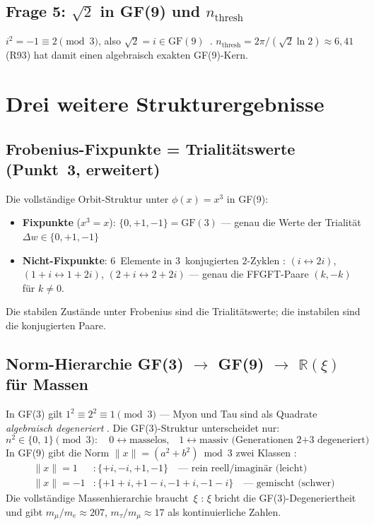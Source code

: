 \subsection{Frage 5: $\sqrt{2}$ in GF(9) und $n_\text{thresh}$}

$i^2 = -1\equiv 2\pmod{3}$, also $\sqrt{2}=i\in\mathrm{GF}(9)$~\BM.
$n_\text{thresh} = 2\pi/(\sqrt{2}\ln 2)\approx 6{,}41$ (R93) hat
damit einen algebraisch exakten GF(9)-Kern.

\section{Drei weitere Strukturergebnisse}
\label{sec:drei_ergebnisse}

\subsection{Frobenius-Fixpunkte = Trialitätswerte (Punkt~3, erweitert)}

Die vollständige Orbit-Struktur unter $\phi(x)=x^3$ in GF(9):
\begin{itemize}
  \item \textbf{Fixpunkte} ($x^3=x$): $\{0,+1,-1\} = \mathrm{GF}(3)$ — genau die
    Werte der Trialität $\Delta w\in\{0,+1,-1\}$ \BM
  \item \textbf{Nicht-Fixpunkte}: 6~Elemente in 3~konjugierten $2$-Zyklen \BM:
    $(i\leftrightarrow 2i)$, $(1{+}i\leftrightarrow 1{+}2i)$,
    $(2{+}i\leftrightarrow 2{+}2i)$ — genau die FFGFT-Paare $(k,-k)$ für $k\neq 0$.
\end{itemize}
Die stabilen Zustände unter Frobenius sind die Trialitätswerte;
die instabilen sind die konjugierten Paare.

\subsection{Norm-Hierarchie GF(3) $\to$ GF(9) $\to$ $\mathbb{R}(\xi)$ für Massen}

In GF(3) gilt $1^2 \equiv 2^2 \equiv 1 \pmod{3}$ — Myon und Tau sind
als Quadrate \emph{algebraisch degeneriert} \BM.
Die GF(3)-Struktur unterscheidet nur:
\begin{equation}
  n^2 \in \{0,\, 1\} \pmod{3}: \quad
  0 \leftrightarrow \text{masselos,}\quad
  1 \leftrightarrow \text{massiv (Generationen 2+3 degeneriert)}
\end{equation}
In GF(9) gibt die Norm $\|x\| = (a^2+b^2)\bmod 3$ zwei Klassen \BM:
\begin{align*}
  \|x\| = 1&: \{+i,-i,+1,-1\}\quad \text{— rein reell/imaginär (leicht)} \\
  \|x\| = -1&: \{+1+i,+1-i,-1+i,-1-i\}\quad \text{— gemischt (schwer)}
\end{align*}
Die vollständige Massenhierarchie braucht~$\xi$ \KM:
$\xi$ bricht die GF(3)-Degeneriertheit und gibt $m_\mu/m_e\approx 207$,
$m_\tau/m_\mu\approx 17$ als kontinuierliche Zahlen.

